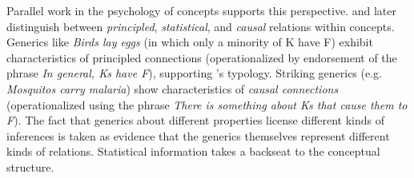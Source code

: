 \documentclass[12pt,letterpaper]{article}
\begin{document}
Parallel work in the psychology of concepts supports this perspective.
 and later  distinguish between \emph{principled}, \emph{statistical}, and \emph{causal} relations within concepts. 
Generics like \emph{Birds lay eggs} (in which only a minority of K have F) exhibit characteristics of principled connections (operationalized by endorsement of the phrase \emph{In general, Ks have F}), supporting 's typology.
Striking generics (e.g. \emph{Mosquitos carry malaria}) show characteristics of \emph{causal connections} (operationalized using the phrase \emph{There is something about Ks that cause them to F}). 
The fact that generics about different properties license different kinds of inferences is taken as evidence that the generics themselves represent different kinds of relations. Statistical information takes a backseat to the conceptual structure.










\end{document}
